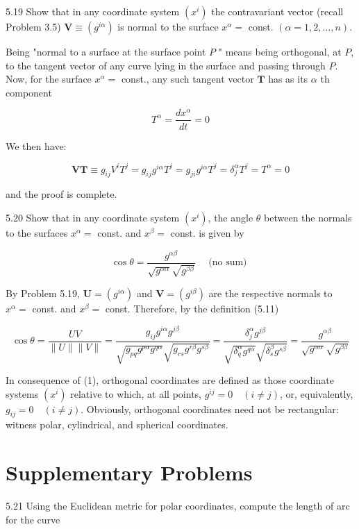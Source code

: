 \documentclass[10pt]{article}
\begin{document}
5.19 Show that in any coordinate system $\left(x^{i}\right)$ the contravariant vector (recall Problem 3.5) $\mathbf{V} \equiv\left(g^{i \alpha}\right)$ is normal to the surface $x^{\alpha}=$ const. $(\alpha=1,2, \ldots, n)$.

Being "normal to a surface at the surface point $P$ " means being orthogonal, at $P$, to the tangent vector of any curve lying in the surface and passing through $P$. Now, for the surface $x^{\alpha}=$ const., any such tangent vector $\mathbf{T}$ has as its $\alpha$ th component

$$
T^{\alpha}=\frac{d x^{\alpha}}{d t}=0
$$

We then have:

$$
\mathbf{V T} \equiv g_{i j} V^{i} T^{j}=g_{i j} g^{i \alpha} T^{j}=g_{j i} g^{i \alpha} T^{j}=\delta_{j}^{\alpha} T^{j}=T^{\alpha}=0
$$

and the proof is complete.

5.20 Show that in any coordinate system $\left(x^{i}\right)$, the angle $\theta$ between the normals to the surfaces $x^{\alpha}=$ const. and $x^{\beta}=$ const. is given by


\begin{equation*}
\cos \theta=\frac{g^{\alpha \beta}}{\sqrt{g^{\alpha \alpha}} \sqrt{g^{\beta \beta}}} \quad \text { (no sum) } \tag{1}
\end{equation*}


By Problem 5.19, $\mathbf{U}=\left(g^{i \alpha}\right)$ and $\mathbf{V}=\left(g^{i \beta}\right)$ are the respective normals to $x^{\alpha}=$ const. and $x^{\beta}=$ const. Therefore, by the definition (5.11)

$$
\cos \theta=\frac{U V}{\|U\|\|V\|}=\frac{g_{i j} g^{i \alpha} g^{j \beta}}{\sqrt{g_{p q} g^{p \alpha} g^{q \alpha}} \sqrt{g_{r s} g^{r \beta} g^{s \beta}}}=\frac{\delta_{j}^{\alpha} g^{j \beta}}{\sqrt{\delta_{q}^{\alpha} g^{q \alpha}} \sqrt{\delta_{s}^{\beta} g^{s \beta}}}=\frac{g^{\alpha \beta}}{\sqrt{g^{\alpha \alpha}} \sqrt{g^{\beta \beta}}}
$$

In consequence of (1), orthogonal coordinates are defined as those coordinate systems $\left(x^{i}\right)$ relative to which, at all points, $g^{i j}=0 \quad(i \neq j)$, or, equivalently, $g_{i j}=0 \quad(i \neq j)$. Obviously, orthogonal coordinates need not be rectangular: witness polar, cylindrical, and spherical coordinates.

\section*{Supplementary Problems}
5.21 Using the Euclidean metric for polar coordinates, compute the length of arc for the curve
\end{document}
